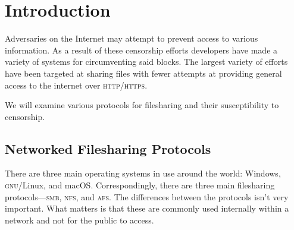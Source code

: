 \section{Introduction}\label{sec:intro}

Adversaries on the Internet may attempt to prevent access to various
information. As a result of these censorship efforts developers have made a
variety of systems for circumventing said blocks. The largest variety of efforts
have been targeted at sharing files with fewer attempts at providing general
access to the internet over \textsc{http}/\textsc{https}.

We will examine various protocols for filesharing and their susceptibility to
censorship.

\subsection{Networked Filesharing Protocols}

There are three main operating systems in use around the world: Windows,
\textsc{gnu}/Linux, and macOS. Correspondingly, there are three main filesharing
protocols---\textsc{smb}, \textsc{nfs}, and \textsc{afs}. The differences
between the protocols isn't very important. What matters is that these are
commonly used internally within a network and not for the public to access.




